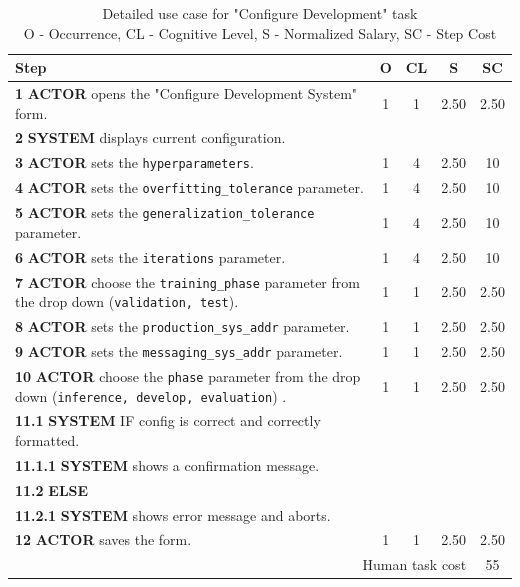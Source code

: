 \begin{table}[H]
    \centering
    \begin{tabularx}{\textwidth}{|X|c|c|c|c|}
    \hline
    \textbf{Step} & \textbf{O} & \textbf{CL} & \textbf{S} & \textbf{SC} \\
    \hline
    \textbf{1} \textbf{ACTOR} opens the "Configure Development System" form. & 1 & 1 & 2.50 & 2.50\\
    \hline
    \textbf{2} \textbf{SYSTEM} displays current configuration. & & & & \\
    \hline
    \textbf{3} \textbf{ACTOR} sets the \texttt{hyperparameters}. & 1 & 4 & 2.50 & 10 \\
    \hline
    \textbf{4} \textbf{ACTOR} sets the \texttt{overfitting\_tolerance} parameter. & 1 & 4 & 2.50 & 10 \\
    \hline
    \textbf{5} \textbf{ACTOR} sets the \texttt{generalization\_tolerance} parameter. & 1 & 4 & 2.50 & 10 \\
    \hline
    \textbf{6} \textbf{ACTOR} sets the \texttt{iterations} parameter. & 1 & 4 & 2.50 & 10 \\
    \hline
    \textbf{7} \textbf{ACTOR} choose the \texttt{training\_phase} parameter from the drop down (\texttt{validation, test}). & 1 & 1 & 2.50 & 2.50\\
    \hline
    \textbf{8} \textbf{ACTOR} sets the \texttt{production\_sys\_addr} parameter. & 1 & 1 & 2.50 & 2.50 \\
    \hline
    \textbf{9} \textbf{ACTOR} sets the \texttt{messaging\_sys\_addr} parameter. & 1 & 1 & 2.50 & 2.50 \\
    \hline
    \textbf{10} \textbf{ACTOR} choose the \texttt{phase} parameter from the drop down (\texttt{inference, develop, evaluation}) . & 1 & 1 & 2.50 & 2.50 \\
    \hline
    \textbf{11.1} \textbf{SYSTEM} IF config is correct and correctly formatted. & & & & \\
    \hline
    \textbf{11.1.1} \textbf{SYSTEM} shows a confirmation message. & & & & \\
    \hline
    \textbf{11.2} \textbf{ELSE} & & & & \\
    \hline
    \textbf{11.2.1} \textbf{SYSTEM} shows error message and aborts. & & & & \\
    \hline
    \textbf{12} \textbf{ACTOR} saves the form. & 1 & 1 & 2.50 & 2.50 \\
    \hline
    \multicolumn{4}{|r|}{Human task cost} & 55 \\
    \hline
    \end{tabularx}
    \caption{Detailed use case for "Configure Development" task\\ 
    O - Occurrence, CL - Cognitive Level, S - Normalized Salary, SC - Step Cost}
    \label{table:configure_development_system}
    \end{table}
